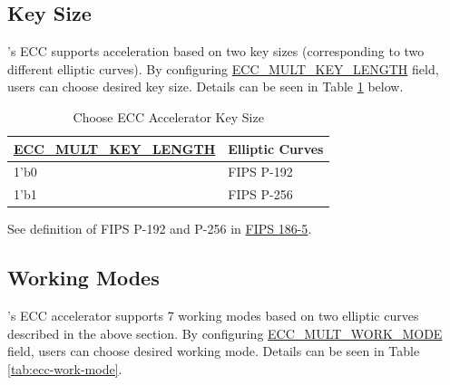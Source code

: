\documentclass[main\_\_EN.tex]{subfiles}
\begin{document}
\subsection{Key Size}

\chipname{}'s ECC supports acceleration based on two key sizes (corresponding to two different elliptic curves). By configuring \hyperref[fielddesc:ECCMULTKEYLENGTH]{ECC\_MULT\_KEY\_LENGTH} field, users can choose desired key size. Details can be seen in Table \ref{tab:ecc-key-length} below.

\begin{table}[H]
    \centering
    \caption{Choose ECC Accelerator Key Size}
    \label{tab:ecc-key-length}
    \begin{threeparttable}
    \begin{tabular}{|p{4.2cm}|p{3.6cm}|}
    \hline
        \rowcolor{lightgray}
        \textbf{\hyperref[fielddesc:ECCMULTKEYLENGTH]{ECC\_MULT\_KEY\_LENGTH}} & \textbf{Elliptic Curves} \\ \hline
        1'b0 & FIPS P-192  \\\hline
        1'b1 & FIPS P-256  \\\hline
    \end{tabular}
    \begin{tablenotes}
        \item[1] See definition of FIPS P-192 and P-256 in \href{https://nvlpubs.nist.gov/nistpubs/FIPS/NIST.FIPS.186-5.pdf}{FIPS 186-5}.
    \end{tablenotes}
    \end{threeparttable}
\end{table}

\subsection{Working Modes}

\chipname{}'s ECC accelerator supports 7 working modes based on two elliptic curves described in the above section. By configuring \hyperref[fielddesc:ECCMULTWORKMODE]{ECC\_MULT\_WORK\_MODE} field, users can choose desired working mode. Details can be seen in Table \ref{tab:ecc-work-mode}.
\end{document}
